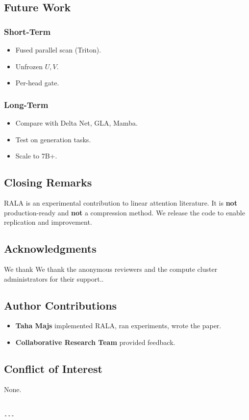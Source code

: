 \subsection{Future Work}

\subsubsection{Short-Term}

\begin{itemize}
\item Fused parallel scan (Triton).
\item Unfrozen $U, V$.
\item Per-head gate.

\end{itemize}
\subsubsection{Long-Term}

\begin{itemize}
\item Compare with Delta Net, GLA, Mamba.
\item Test on generation tasks.
\item Scale to 7B+.

\end{itemize}
\subsection{Closing Remarks}

RALA is an experimental contribution to linear attention literature. It is 
\textbf{not} production-ready and \textbf{not} a compression method. We release the 
code to enable replication and improvement.

\subsection{Acknowledgments}

We thank We thank the anonymous reviewers and the compute cluster administrators for their support..

\subsection{Author Contributions}

\begin{itemize}
\item \textbf{Taha Majs} implemented RALA, ran experiments, wrote the paper.
\item \textbf{Collaborative Research Team} provided feedback.

\end{itemize}
\subsection{Conflict of Interest}

None.
\begin{lstlisting}

---
\end{lstlisting}